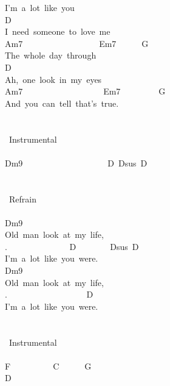 {I'm\ a\ lot\ like\ you\\
D\ \\
I\ need\ someone\ to\ love\ me\\
Am7\ \ \ \ \ \ \ \ \ \ \ \ \ \ \ \ \ \ Em7\ \ \ \ \ \ G\\
The\ whole\ day\ through\\
D\\
Ah,\ one\ look\ in\ my\ eyes\\
Am7\ \ \ \ \ \ \ \ \ \ \ \ \ \ \ \ \ \ \ Em7\ \ \ \ \ \ \ \ \ G\\
And\ you\ can\ tell\ that's\ true.\\
\\
\\
\lbrack\ Instrumental\rbrack\\
\\
Dm9\ \ \ \ \ \ \ \ \ \ \ \ \ \ \ \ \ \ \ \ D\ Dsus\ D\\
\\
\\
\lbrack\ Refrain\rbrack\\
\\
Dm9\\
Old\ man\ look\ at\ my\ life,\\
. \ \ \ \ \ \ \ \ \ \ \ \ \ \ D\ \ \ \ \ \ \ \ Dsus\ D\\
I'm\ a\ lot\ like\ you\ were.\\
Dm9\\
Old\ man\ look\ at\ my\ life,\\
. \ \ \ \ \ \ \ \ \ \ \ \ \ \ \ \ \ \ D\\
I'm\ a\ lot\ like\ you\ were.\\
\\
\\
\lbrack\ Instrumental\rbrack\\
\\
F\ \ \ \ \ \ \ \ \ \ C\ \ \ \ \ \ G\\
D\ }
